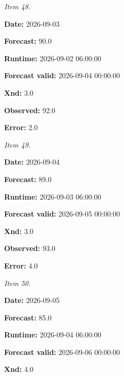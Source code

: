 \documentclass[11pt]{article}
\begin{document}
\par\noindent\textit{Item 48.}\par \par\noindent\textbf{Date:} 2026-09-03

\par\noindent\textbf{Forecast:} 90.0

\par\noindent\textbf{Runtime:} 2026-09-02 06:00:00

\par\noindent\textbf{Forecast valid:} 2026-09-04 00:00:00

\par\noindent\textbf{Xnd:} 3.0

\par\noindent\textbf{Observed:} 92.0

\par\noindent\textbf{Error:} 2.0

\par\noindent\textit{Item 49.}\par \par\noindent\textbf{Date:} 2026-09-04

\par\noindent\textbf{Forecast:} 89.0

\par\noindent\textbf{Runtime:} 2026-09-03 06:00:00

\par\noindent\textbf{Forecast valid:} 2026-09-05 00:00:00

\par\noindent\textbf{Xnd:} 3.0

\par\noindent\textbf{Observed:} 93.0

\par\noindent\textbf{Error:} 4.0

\par\noindent\textit{Item 50.}\par \par\noindent\textbf{Date:} 2026-09-05

\par\noindent\textbf{Forecast:} 85.0

\par\noindent\textbf{Runtime:} 2026-09-04 06:00:00

\par\noindent\textbf{Forecast valid:} 2026-09-06 00:00:00

\par\noindent\textbf{Xnd:} 4.0
\end{document}
